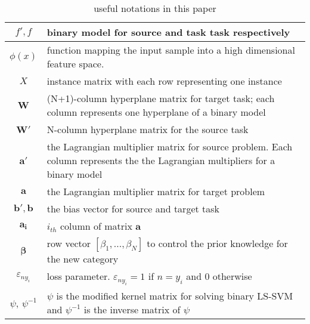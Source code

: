 \begin{table}[htbp]
  \centering
  \caption{useful notations in this paper}
    \begin{tabular}{|c|L{7cm}|}
    \hline
    $f',f$ & binary model for source and task task respectively\\
    \hline
    $\phi(x)$ &  function mapping the input sample into a high dimensional feature space. \\ \hline
    $X$     & instance matrix with each row representing one instance \\\hline
    $\boldsymbol{W} $    & (N+1)-column hyperplane matrix for target task; each column represents one hyperplane of a binary model \\\hline
    $\boldsymbol{W'}$    & N-column hyperplane matrix for the source task \\\hline
    $\boldsymbol{a'} $   & the Lagrangian multiplier matrix for source problem. Each column represents the the Lagrangian multipliers for a binary model  \\\hline
    $\boldsymbol{a} $    & the Lagrangian multiplier matrix for target problem \\
    \hline
    $\boldsymbol{b'},\boldsymbol{b}$  & the bias vector for source and target task \\
        \hline
    $\boldsymbol{a_i}$ & $i_{th}$ column of matrix $\boldsymbol{a}$ \\ \hline
    $\boldsymbol{\beta}$ & row vector $\left[ {{\beta _1},...,{\beta _N}} \right]$ to control the prior knowledge for the new category\\ \hline
    $\varepsilon_{ny_i}$&loss parameter. $\varepsilon _{n{y_i}}=1$ if $n=y_i$ and 0 otherwise\\ \hline
    $\psi$, $\psi^{-1}$ & $\psi$ is the modified kernel matrix for solving binary LS-SVM and $\psi^{-1}$ is the inverse matrix of $\psi$\\ \hline
    \end{tabular}%
  \label{tab:notation}%
\end{table}%

 


